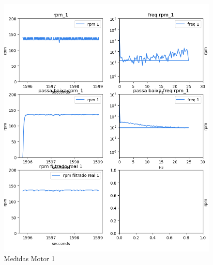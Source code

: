 \begin{figure}[h]
	\centering
	\includegraphics{figures/medidas_motor_1}
	\caption{Medidas Motor 1}
	\label{fig:medidas_motor_1}
\end{figure}

